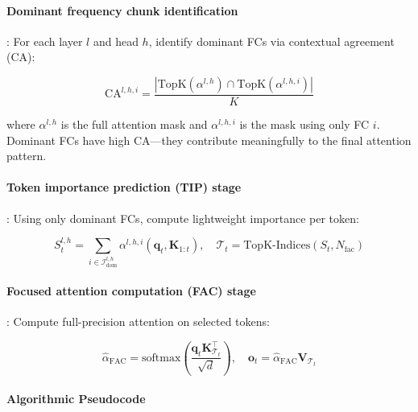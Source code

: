 \paragraph{Dominant frequency chunk identification}: For each layer $l$ and head $h$, identify dominant FCs via contextual agreement (CA):

\[
\text{CA}^{l,h,i} = \frac{|\text{TopK}(\alpha^{l,h}) \cap \text{TopK}(\alpha^{l,h,i})|}{K}
\]

where $\alpha^{l,h}$ is the full attention mask and $\alpha^{l,h,i}$ is the mask using only FC $i$. Dominant FCs have high CA---they contribute meaningfully to the final attention pattern.

\paragraph{Token importance prediction (TIP) stage}: Using only dominant FCs, compute lightweight importance per token:

\[
S_t^{l,h} = \sum_{i \in \mathcal{I}_{\text{dom}}^{l,h}} \alpha^{l,h,i}(\mathbf{q}_t, \mathbf{K}_{1:t}), \quad \mathcal{T}_t = \text{TopK-Indices}(S_t, N_{\text{fac}})
\]

\paragraph{Focused attention computation (FAC) stage}: Compute full-precision attention on selected tokens:

\[
\hat{\alpha}_{\text{FAC}} = \text{softmax}\left(\frac{\mathbf{q}_t \mathbf{K}_{\mathcal{T}_t}^\top}{\sqrt{d}}\right), \quad \mathbf{o}_t = \hat{\alpha}_{\text{FAC}} \mathbf{V}_{\mathcal{T}_t}
\]

\paragraph{Algorithmic Pseudocode}

